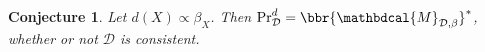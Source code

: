 \documentclass[letterpaper]{article} %
\makeatletter
\theoremstyle{plain}
\newtheorem{lemma}[theorem]{Lemma}
\newtheorem{conj}[theorem]{Conjecture}
\theoremstyle{definition}
\theoremstyle{remark}
\newcommand{\recall}[1]{\medskip\par\noindent{\bf \expandarg\Cref{thmt@@#1}.} \begingroup\em \noindent
	\expandafter\csname#1\endcsname* \endgroup\par\smallskip}
\newcommand{\dg}[1]{\mathbdcal{#1}}
\newcommand\Pa{\mathbf{Pa}}
\newcommand{\N}{\mathcal N}
\newcommand{\IDef}[1]{\mathit{IDef}_{\!#1}}
\newcommand\Inc{\mathit{Inc}}
\newcommand{\PDGof}[1]{{\dg M}_{#1}}
\makeatother
\begin{document}
\begin{conj}\label{thm:dns-are-completely-pdgs}
	Let $d(X) \propto \beta_X$. Then
	$\Pr_{\mathcal D}^d = \bbr{\PDGof{\mathcal D, \beta}}^*$, whether or not $\mathcal D$ is consistent.
\end{conj}


%
%	
%
%

\end{document}
